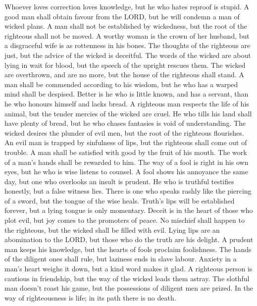  Whoever loves correction loves knowledge, but he who
hates reproof is stupid.  A good man shall obtain favour
from the LORD, but he will condemn a man of wicked plans. 
A man shall not be established by wickedness, but the root of the
righteous shall not be moved.  A worthy woman is the crown
of her husband, but a disgraceful wife is as rottenness in his bones.
 The thoughts of the righteous are just, but the advice of
the wicked is deceitful.  The words of the wicked are
about lying in wait for blood, but the speech of the upright rescues
them.  The wicked are overthrown, and are no more, but the
house of the righteous shall stand.  A man shall be
commended according to his wisdom, but he who has a warped mind shall be
despised.  Better is he who is little known, and has a
servant, than he who honours himself and lacks bread.  A
righteous man respects the life of his animal, but the tender mercies of
the wicked are cruel.  He who tills his land shall have
plenty of bread, but he who chases fantasies is void of understanding.
 The wicked desires the plunder of evil men, but the root
of the righteous flourishes.  An evil man is trapped by
sinfulness of lips, but the righteous shall come out of trouble.
 A man shall be satisfied with good by the fruit of his
mouth. The work of a man's hands shall be rewarded to him.
 The way of a fool is right in his own eyes, but he who
is wise listens to counsel.  A fool shows his annoyance
the same day, but one who overlooks an insult is prudent.
 He who is truthful testifies honestly, but a false
witness lies.  There is one who speaks rashly like the
piercing of a sword, but the tongue of the wise heals. 
Truth's lips will be established forever, but a lying tongue is only
momentary.  Deceit is in the heart of those who plot
evil, but joy comes to the promoters of peace.  No
mischief shall happen to the righteous, but the wicked shall be filled
with evil.  Lying lips are an abomination to the LORD,
but those who do the truth are his delight.  A prudent
man keeps his knowledge, but the hearts of fools proclaim foolishness.
 The hands of the diligent ones shall rule, but laziness
ends in slave labour.  Anxiety in a man's heart weighs it
down, but a kind word makes it glad.  A righteous person
is cautious in friendship, but the way of the wicked leads them astray.
 The slothful man doesn't roast his game, but the
possessions of diligent men are prized.  In the way of
righteousness is life; in its path there is no death.

